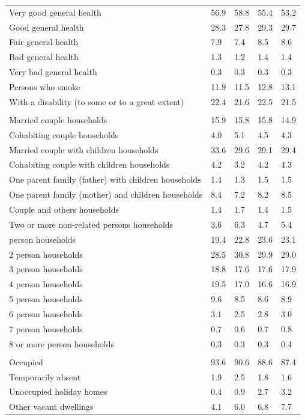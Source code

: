 \documentclass{article}
\begin{document}
\begin{table}[h]
\begin{tabular}{KTTTT}
    \hline
Very good general health & 56.9& 58.8&55.4& 53.2\\
Good general health & 28.3& 27.8& 29.3& 29.7\\
Fair general health & 7.9& 7.4&8.5& 8.6\\
Bad general health & 1.3& 1.2&1.4& 1.4\\
Very bad general health & 0.3& 0.3&0.3& 0.3\\
    \hline
Persons who smoke & 11.9& 11.5&12.8& 13.1\\
    \hline
With a disability (to some or to a great extent) & 22.4& 21.6&22.5& 21.5\\
\hline
    \\ 
    \hline
Married couple households & 15.9& 15.8& 15.8& 14.9\\
Cohabiting couple households & 4.0& 5.1& 4.5& 4.3\\
Married couple with children households & 33.6& 29.6& 29.1& 29.4\\
Cohabiting couple with children households & 4.2& 3.2& 4.2& 4.3\\
One parent family (father) with  children households & 1.4& 1.3& 1.5& 1.5\\
One parent family (mother) and children households & 8.4& 7.2& 8.2& 8.5\\
Couple and others households  & 1.4& 1.7& 1.4& 1.5\\
Two or more non-related persons households & 3.6& 6.3& 4.7& 5.4\\
     person households & 19.4& 22.8& 23.6& 23.1\\
2 person households & 28.5& 30.8& 29.9& 29.0\\
3 person households & 18.8& 17.6& 17.6& 17.9\\
4 person households & 19.5& 17.0& 16.6& 16.9\\
5 person households & 9.6& 8.5& 8.6& 8.9\\
6 person households & 3.1& 2.5& 2.8& 3.0\\
7 person households & 0.7& 0.6& 0.7& 0.8\\
8 or more person households & 0.3& 0.3& 0.3& 0.4\\
\hline
    \\ 
    \hline
Occupied & 93.6& 90.6& 88.6& 87.4\\
Temporarily absent & 1.9& 2.5& 1.8& 1.6\\
Unoccupied holiday homes & 0.4& 0.9& 2.7& 3.2\\
Other vacant dwellings & 4.1& 6.0& 6.8& 7.7\\
\hline
\end{tabular}
\end{table}
\end{document}
